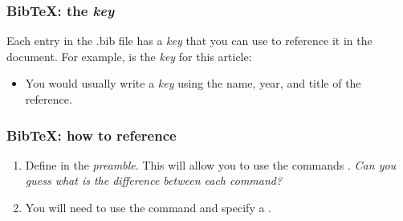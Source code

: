 \documentclass{beamer}
\def\openesc{\color{blue}}
\def\closeesc{\color{black}}
\def\vbdelim{\catcode`<=\active\catcode`>=\active%
\def<{\openesc}
\def>{\closeesc}}
\begin{document}
\begin{frame}[fragile]
\frametitle{BibTeX: the \textit{key}}
Each entry in the .bib file has a \textit{key} that you can use to reference it in the document. For example,
\color{red}{Jacobson1999Towards} \color{black}{} is the \textit{key} for this article:
\begin{framed}
\begin{verbnobox}[\vbdelim]
@Article<{>Jacobson1999Towards,
author = <{>Van Jacobson<}>,
...
\end{verbnobox}
\end{framed}

\begin{itemize}
\item You would usually write a \textit{key} using the name, year, and title of the reference. \\
\end{itemize}
\end{frame}

\begin{frame}[fragile]
\frametitle{BibTeX: how to reference}

\begin{enumerate}
\item Define \color{blue}{\verb|\usepackage{natbib}|} \color{black}{} in the \textit{preamble}. This will allow you to use the commands \color{blue}{\verb|\citet|} \color{black}{and} 
\color{blue}{\verb|\citep|} \color{black}{}. \textit{Can you guess what is the difference between each command?}\\
\item You will need to use the command \color{blue}{\verb||} \color{black}{} and specify a  \color{blue}{\verb||} \color{black}{}. \\
\end{enumerate}

\begin{framed}
\end{framed}
\end{frame} 
\end{document}

